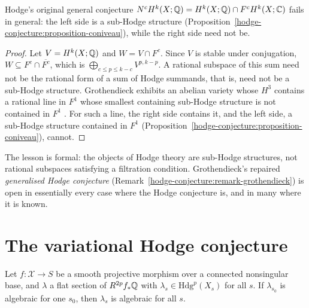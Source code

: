 \begin{proposition}\label{failures:proposition-general-false}
Hodge's original general conjecture $N^cH^k(X; \mathbb{Q}) = H^k(X; \mathbb{Q}) \cap F^cH^k(X; \mathbb{C})$ fails in general: the left side is a sub-Hodge structure
(Proposition~\ref{hodge-conjecture:proposition-coniveau}), while the right side need not be.
\end{proposition}

\begin{proof}
Let $V = H^k(X; \mathbb{Q})$ and $W = V \cap F^c$. Since $V$ is stable under conjugation, $W \subseteq F^c \cap \overline{F^c}$, which is $\bigoplus_{c \leq p \leq k-c}V^{p,k-p}$. A rational subspace of this sum need
not be the rational form of a sum of Hodge summands, that is, need not be a sub-Hodge structure. Grothendieck exhibits an abelian variety whose $H^3$ contains a rational line in $F^1$ whose smallest
containing sub-Hodge structure is not contained in $F^1$ \cite{grothendieck-1969}. For such a line, the right side contains it, and the left side, a sub-Hodge structure contained in $F^1$
(Proposition~\ref{hodge-conjecture:proposition-coniveau}), cannot.
\end{proof}

\begin{remark}\label{failures:remark-general-lesson}
The lesson is formal: the objects of Hodge theory are sub-Hodge structures, not rational subspaces satisfying a filtration condition. Grothendieck's repaired \emph{generalised Hodge conjecture}
(Remark~\ref{hodge-conjecture:remark-grothendieck}) is open in essentially every case where the Hodge conjecture is, and in many where it is known.
\end{remark}

\section{The variational Hodge conjecture}\label{failures:section-variational}

\begin{conjecture}\label{failures:conjecture-variational}
Let $f \colon \mathcal{X} \to S$ be a smooth projective morphism over a connected nonsingular base, and $\lambda$ a flat section of $R^{2p}f_*\mathbb{Q}$ with $\lambda_s \in \mathrm{Hdg}^p(X_s)$ for all $s$. If $\lambda_{s_0}$ is
algebraic for one $s_0$, then $\lambda_s$ is algebraic for all $s$.
\end{conjecture}

